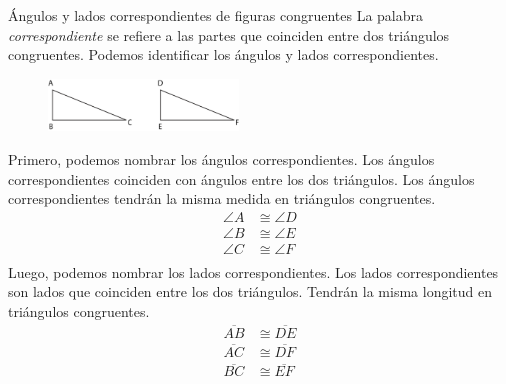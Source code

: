 \begin{infocard}{Ángulos y lados correspondientes de figuras congruentes}
    La palabra \emph{correspondiente} se refiere a las partes que coinciden entre dos triángulos congruentes. Podemos identificar los ángulos y lados correspondientes.
    \begin{figure}[H]
        \centering
        \includegraphics[width=0.45\textwidth]{../images/congruencia02}
        \caption{}
        \label{fig:congruencia01}
    \end{figure}

    \begin{multicols}{2}
        Primero, podemos nombrar los ángulos correspondientes. Los ángulos correspondientes coinciden con ángulos entre los dos triángulos. Los ángulos correspondientes tendrán la misma medida en triángulos congruentes.
        \begin{align*}
            \angle A & \cong \angle D \\
            \angle B & \cong \angle E \\
            \angle C & \cong \angle F \\
        \end{align*}
        Luego, podemos nombrar los lados correspondientes. Los lados correspondientes son lados que coinciden entre los dos triángulos. Tendrán la misma longitud en triángulos congruentes.
        \begin{align*}
            \overline{AB} & \cong \overline{DE} \\
            \overline{AC} & \cong \overline{DF} \\
            \overline{BC} & \cong \overline{EF} \\
        \end{align*}
    \end{multicols}
\end{infocard}
